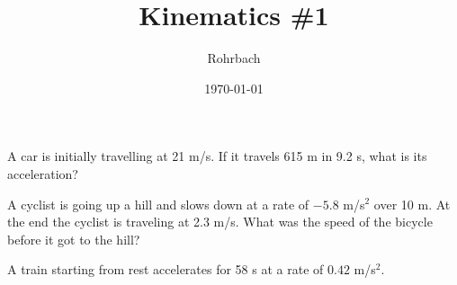 \documentclass[11pt]{exam}
\title{Kinematics \#1}
\author{Rohrbach}
\date{\today}
\begin{document}
\maketitle

\begin{questions}
  \question
    A car is initially travelling at 21 m/s.  If it travels 615 m in 9.2 s, what is its acceleration?
    \vs[2]

  \question
    A cyclist is going up a hill and slows down at a rate of $-5.8$ m/s$^2$ over 10 m.  At the end the cyclist is traveling at 2.3 m/s.  What was the speed of the bicycle before it got to the hill?
    \vs[2]

  \question
    A train starting from rest accelerates for 58 s at a rate of $0.42$ m/s$^2$.

  
\end{questions}
\end{document}
